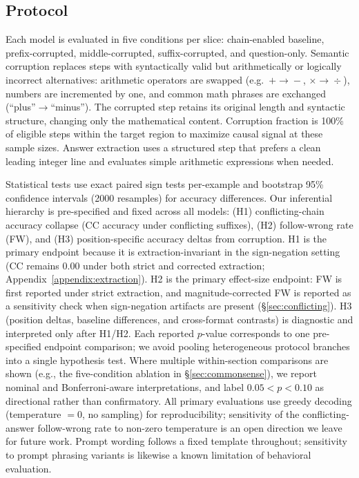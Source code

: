 \documentclass{article}
\theoremstyle{definition}
\theoremstyle{definition}
\begin{document}
\subsection{Protocol}
\label{sec:protocol}

Each model is evaluated in five conditions per slice: chain-enabled baseline,
prefix-corrupted, middle-corrupted, suffix-corrupted, and question-only.
Semantic corruption replaces steps with syntactically valid but arithmetically
or logically incorrect alternatives: arithmetic operators are swapped
(e.g.\ $+\!\to\!-$, $\times\!\to\!\div$), numbers are incremented by one,
and common math phrases are exchanged (``plus''$\to$``minus'').
The corrupted step retains its original length and syntactic
structure, changing only the mathematical content.
Corruption fraction is 100\% of eligible
steps within the target region to maximize causal signal at these sample
sizes. Answer extraction uses a structured step that prefers a clean
leading integer line and evaluates simple arithmetic expressions when needed.

Statistical tests use exact paired sign tests per-example and bootstrap 95\%
confidence intervals (2000 resamples) for accuracy differences.
Our inferential hierarchy is pre-specified and fixed across all models:
(H1) conflicting-chain accuracy collapse (CC accuracy under conflicting
suffixes), (H2) follow-wrong rate (FW), and (H3) position-specific
accuracy deltas from corruption.
H1 is the primary endpoint because it is extraction-invariant in the
sign-negation setting (CC remains 0.00 under both strict and corrected
extraction; Appendix~\ref{appendix:extraction}).
H2 is the primary effect-size endpoint: FW is first reported under strict
extraction, and magnitude-corrected FW is reported as a sensitivity check when
sign-negation artifacts are present (\S\ref{sec:conflicting}).
H3 (position deltas, baseline differences, and cross-format contrasts) is
diagnostic and interpreted only after H1/H2.
Each reported $p$-value corresponds to one pre-specified endpoint comparison;
we avoid pooling heterogeneous protocol branches into a single hypothesis test.
Where multiple within-section comparisons are shown (e.g., the five-condition
ablation in \S\ref{sec:commonsense}), we report nominal and Bonferroni-aware
interpretations, and label $0.05 < p < 0.10$ as directional rather than
confirmatory.
All primary evaluations use greedy decoding (temperature $= 0$, no sampling)
for reproducibility; sensitivity of the conflicting-answer follow-wrong rate
to non-zero temperature is an open direction we leave for future work.
Prompt wording follows a fixed template throughout; sensitivity to prompt
phrasing variants is likewise a known limitation of behavioral evaluation.
\end{document}
